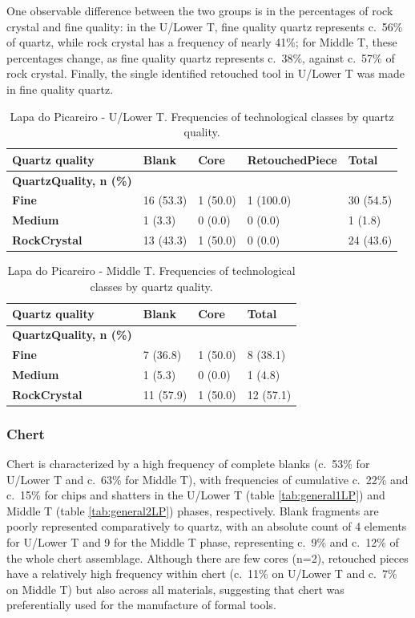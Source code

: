 \documentclass[12pt,twoside]{reedthesis}
\begin{document}
One observable difference between the two groups is in the percentages of rock crystal and fine quality: in the U/Lower T, fine quality quartz represents c.~56\% of quartz, while rock crystal has a frequency of nearly 41\%; for Middle T, these percentages change, as fine quality quartz represents c.~38\%, against c.~57\% of rock crystal. Finally, the single identified retouched tool in U/Lower T was made in fine quality quartz.
\begin{table}

\caption{\label{tab:quartzqualityTG}Lapa do Picareiro - U/Lower T. Frequencies of technological classes by quartz quality.}
\centering
\begin{tabular}[t]{>{\bfseries}lllll}
\toprule
Quartz quality & Blank & Core & RetouchedPiece & Total\\
\midrule
QuartzQuality, n (\%) &  &  &  & \\
Fine & 16 (53.3) & 1 (50.0) & 1 (100.0) & 30 (54.5)\\
Medium & 1 (3.3) & 0 (0.0) & 0 (0.0) & 1 (1.8)\\
RockCrystal & 13 (43.3) & 1 (50.0) & 0 (0.0) & 24 (43.6)\\
\bottomrule
\end{tabular}
\end{table}
\begin{table}

\caption{\label{tab:quartzqualityPR}Lapa do Picareiro - Middle T. Frequencies of technological classes by quartz quality.}
\centering
\begin{tabular}[t]{>{\bfseries}llll}
\toprule
Quartz quality & Blank & Core & Total\\
\midrule
QuartzQuality, n (\%) &  &  & \\
Fine & 7 (36.8) & 1 (50.0) & 8 (38.1)\\
Medium & 1 (5.3) & 0 (0.0) & 1 (4.8)\\
RockCrystal & 11 (57.9) & 1 (50.0) & 12 (57.1)\\
\bottomrule
\end{tabular}
\end{table}
\hypertarget{chert-1}{%
\subsubsection{Chert}\label{chert-1}}

Chert is characterized by a high frequency of complete blanks (c.~53\% for U/Lower T and c.~63\% for Middle T), with frequencies of cumulative c.~22\% and c.~15\% for chips and shatters in the U/Lower T (table \ref{tab:general1LP}) and Middle T (table \ref{tab:general2LP}) phases, respectively. Blank fragments are poorly represented comparatively to quartz, with an absolute count of 4 elements for U/Lower T and 9 for the Middle T phase, representing c.~9\% and c.~12\% of the whole chert assemblage. Although there are few cores (n=2), retouched pieces have a relatively high frequency within chert (c.~11\% on U/Lower T and c.~7\% on Middle T) but also across all materials, suggesting that chert was preferentially used for the manufacture of formal tools.
\end{document}
